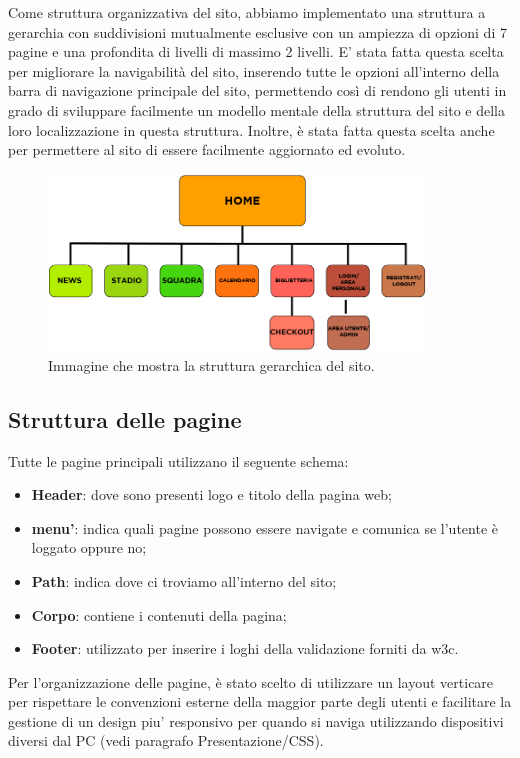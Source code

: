 \documentclass[12pt, a4paper]{article}
\begin{document}
Come struttura organizzativa del sito, abbiamo implementato una struttura a gerarchia con suddivisioni mutualmente esclusive con un ampiezza di opzioni di 7 pagine e una profondita di livelli di massimo 2 livelli.
E' stata fatta questa scelta per migliorare la navigabilità del sito, inserendo tutte le opzioni all'interno della barra di navigazione principale del sito, permettendo così di rendono gli utenti in grado di sviluppare facilmente un modello 
mentale della struttura del sito e della loro localizzazione in questa struttura. Inoltre, è stata fatta questa scelta anche per permettere al sito di essere facilmente aggiornato ed evoluto.

\begin{figure}[htb]
	\centering
	\includegraphics[width=10cm]{img/schema_sito.png}
	\caption{Immagine che mostra la struttura gerarchica del sito.}
\end{figure}

\pagebreak

\subsection{Struttura delle pagine}
Tutte le pagine principali utilizzano il seguente schema:
\begin{itemize}
	\item \textbf{Header}: dove sono presenti logo e titolo della pagina web;
	\item \textbf{menu'}: indica quali pagine possono essere navigate e comunica se l'utente è loggato oppure no;
	\item \textbf{Path}: indica dove ci troviamo all'interno del sito;
	\item \textbf{Corpo}: contiene i contenuti della pagina;
	\item \textbf{Footer}: utilizzato per inserire i loghi della validazione forniti da w3c.
\end{itemize}

Per l'organizzazione delle pagine, è stato scelto di utilizzare un layout verticare per rispettare le convenzioni esterne della maggior parte degli utenti
e facilitare la gestione di un design piu' responsivo per quando si naviga utilizzando dispositivi diversi dal PC (vedi paragrafo Presentazione/CSS).
\end{document}
